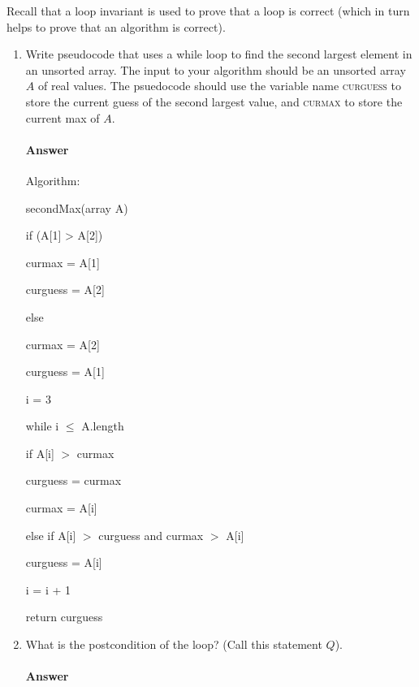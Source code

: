\documentclass{article}
\begin{document}
Recall that a loop invariant is used to prove that a loop is correct (which in
turn helps to prove that an algorithm is correct).

\begin{enumerate}

    \item Write pseudocode that uses a while loop to find the second largest
        element in an unsorted array.  The input to your algorithm should be an
        unsorted array $A$ of real values.  The psuedocode should use the
        variable name \textsc{curguess} to store the current guess of the second
        largest value, and \textsc{curmax} to store the current max of $A$.

        \paragraph{Answer} Algorithm:

        secondMax(array A)
        
        \qquad if (A[1] > A[2])
        
        \qquad \qquad curmax = A[1]
       
        \qquad \qquad curguess = A[2]
        
        \qquad else 
       
        \qquad \qquad curmax = A[2]
       
        \qquad \qquad curguess = A[1]
        
        \qquad i = 3
       
        \qquad while i $\leq$ A.length
       
        \qquad \qquad if A[i] $>$ curmax
       
        \qquad \qquad \qquad curguess = curmax
       
        \qquad \qquad \qquad curmax = A[i]
        
        \qquad \qquad else if A[i] $>$ curguess and curmax $>$ A[i]
        
        \qquad \qquad \qquad curguess = A[i]
        
        \qquad \qquad i = i + 1
        
        \qquad return curguess
        

    \item What is the postcondition of the loop? (Call this statement $Q$).

        \paragraph{Answer}


\end{enumerate}
\end{document}
